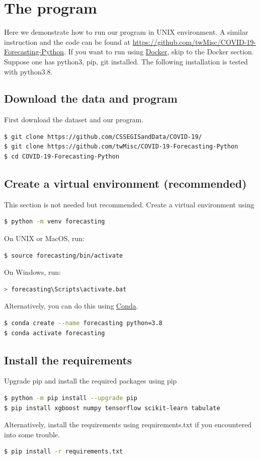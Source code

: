 \documentclass[a4paper,12pt]{article}
\begin{document}
\section{The program}
Here we demonstrate how to run our program in UNIX environment. A similar instruction and the code can be found at \href{https://github.com/twMisc/COVID-19-Forecasting-Python}{https://github.com/twMisc/COVID-19-Forecasting-Python}. If you want to run using \href{https://www.docker.com/}{Docker}, skip to the Docker section. Suppose one has python3, pip, git installed. The following installation is tested with python3.8. 
\subsection{Download the data and program}
First download the dataset and our program. 
\lstset{style=mystyle}
\begin{lstlisting}[language=bash]
$ git clone https://github.com/CSSEGISandData/COVID-19/
$ git clone https://github.com/twMisc/COVID-19-Forecasting-Python
$ cd COVID-19-Forecasting-Python
\end{lstlisting}

\subsection{Create a virtual environment (recommended)}
This section is not needed but recommended. Create a virtual environment using
\begin{lstlisting}[language=bash]
$ python -m venv forecasting
\end{lstlisting}
On UNIX or MacOS, run:
\begin{lstlisting}[language=bash]
$ source forecasting/bin/activate
\end{lstlisting}
On Windows, run:
\begin{lstlisting}[language=bash]
> forecasting\Scripts\activate.bat
\end{lstlisting}
Alternatively, you can do this using \href{https://docs.conda.io/projects/conda/en/latest/user-guide/tasks/manage-environments.html}{Conda}.
\begin{lstlisting}[language=bash]
$ conda create --name forecasting python=3.8
$ conda activate forecasting    
\end{lstlisting}

\subsection{Install the requirements}
Upgrade pip and install the required packages using pip
\begin{lstlisting}[language=bash]
$ python -m pip install --upgrade pip
$ pip install xgboost numpy tensorflow scikit-learn tabulate
 \end{lstlisting}
Alternatively, install the requirements using requirements.txt if you encountered into some trouble.
\begin{lstlisting}[language=bash]
$ pip install -r requirements.txt    
\end{lstlisting}
\end{document}
